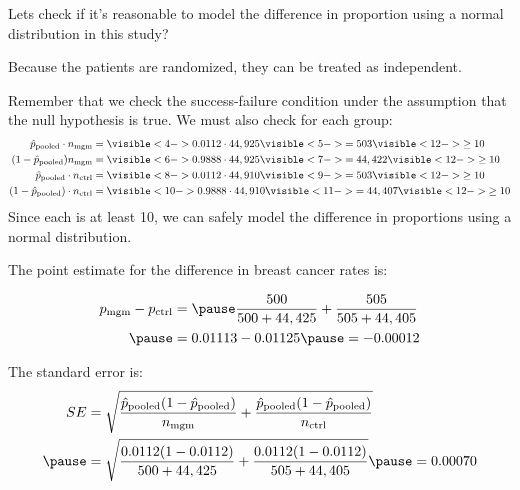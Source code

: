 \documentclass{beamer}
\begin{document}
\begin{frame}
  \begin{examplecont}
    Lets check if it's reasonable to model the difference in proportion using a normal distribution in this study?\pause

    \vspace{1mm}
    Because the patients are randomized, they can be treated as independent.\pause

    \vspace{1mm}
    Remember that we check the success-failure condition under the assumption that the null hypothesis is true. We must also check for each group:
    \begin{equation*}
      \begin{aligned}
        \pooled\cdot\nmgm &= \visible<4->{0.0112\cdot 44,925}\visible<5->{=503}\visible<12->{\geq 10} \\
        (1-\pooled)\nmgm &= \visible<6->{0.9888\cdot 44,925}\visible<7->{=44,422}\visible<12->{\geq 10} \\
        \pooled\cdot\nctrl &= \visible<8->{0.0112\cdot 44,910}\visible<9->{=503}\visible<12->{\geq 10} \\
        (1-\pooled)\cdot\nctrl &= \visible<10->{0.9888\cdot 44,910}\visible<11->{=44,407}\visible<12->{\geq 10} \\
      \end{aligned}
    \end{equation*}
    Since each is at least 10, we can safely model the difference in proportions using a normal distribution.
  \end{examplecont}
\end{frame}

\begin{frame}
  \begin{examplecont}
    The point estimate for the difference in breast cancer rates is:

    \vspace{-2mm}
    \begin{equation*}
      \begin{aligned}
        \pmgm-\pctrl &=\pause
        \dfrac{500}{500+44,425} + \dfrac{505}{505+44,405} \\\pause
        &= 0.01113 - 0.01125 \pause
        = -0.00012
      \end{aligned}
    \end{equation*}\pause

    The standard error is:
    \begin{equation*}
      \begin{aligned}
        SE &= \sqrt{\dfrac{\pooled(1-\pooled)}{\nmgm}+\dfrac{\pooled(1-\pooled)}{\nctrl}} \\\pause
        &= \sqrt{\dfrac{0.0112(1-0.0112)}{500+44,425}+\dfrac{0.0112(1-0.0112)}{505+44,405}} \pause
        = 0.00070
      \end{aligned}
    \end{equation*}
  \end{examplecont}
\end{frame}
\end{document}
